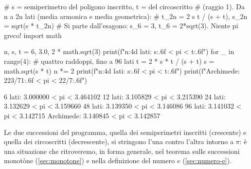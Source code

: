 \begin{python}
# s = semiperimetro del poligono inscritto, t = del circoscritto
# (raggio 1). Da n a 2n lati (media armonica e media geometrica):
#     t_2n = 2 s t / (s + t),      s_2n = sqrt(s * t_2n)
# Si parte dall'esagono: s_6 = 3, t_6 = 2*sqrt(3). Niente pi greco!
import math

n, s, t = 6, 3.0, 2 * math.sqrt(3)
print(f"{n:4d} lati: {s:.6f} < pi < {t:.6f}")
for _ in range(4):               # quattro raddoppi, fino a 96 lati
    t = 2 * s * t / (s + t)
    s = math.sqrt(s * t)
    n *= 2
    print(f"{n:4d} lati: {s:.6f} < pi < {t:.6f}")
print(f"Archimede: {223/71:.6f} < pi < {22/7:.6f}")
\end{python}
\begin{risultato}
   6 lati: 3.000000 < pi < 3.464102
  12 lati: 3.105829 < pi < 3.215390
  24 lati: 3.132629 < pi < 3.159660
  48 lati: 3.139350 < pi < 3.146086
  96 lati: 3.141032 < pi < 3.142715
Archimede: 3.140845 < pi < 3.142857
\end{risultato}

Le due successioni del programma, quella dei semiperimetri inscritti (crescente) e
quella dei circoscritti (decrescente), si stringono l'una contro l'altra intorno a $\pi$:
è una situazione che ritroveremo, in forma generale, nel teorema sulle successioni
monotòne (\cref{sec:monotone}) e nella definizione del numero $e$ (\cref{sec:numero-e}).
